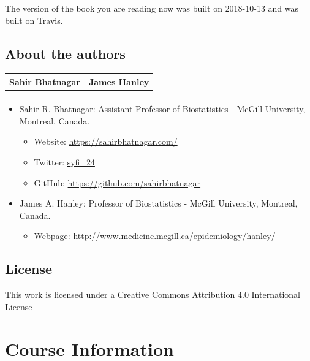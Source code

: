 \documentclass[]{book}
\providecommand{\tightlist}{%
  \setlength{\itemsep}{0pt}\setlength{\parskip}{0pt}}
\providecommand{\tightlist}{%
  \setlength{\itemsep}{0pt}\setlength{\parskip}{0pt}}
\theoremstyle{definition}
\theoremstyle{definition}
\theoremstyle{definition}
\theoremstyle{remark}
\begin{document}
The version of the book you are reading now was built on 2018-10-13 and
was built on
\href{https://travis-ci.org/sahirbhatnagar/MATH697}{Travis}.

\section{About the authors}\label{about-the-authors}

\begin{longtable}[]{@{}cc@{}}
\toprule
Sahir Bhatnagar & James Hanley\tabularnewline
\midrule
\endhead
&\tabularnewline
\bottomrule
\end{longtable}

\begin{itemize}
\tightlist
\item
  Sahir R. Bhatnagar: Assistant Professor of Biostatistics - McGill
  University, Montreal, Canada.

  \begin{itemize}
  \tightlist
  \item
    Website: \url{https://sahirbhatnagar.com/}\\
  \item
    Twitter: \href{https://twitter.com/syfi_24}{syfi\_24}\\
  \item
    GitHub: \url{https://github.com/sahirbhatnagar}\\
  \end{itemize}
\item
  James A. Hanley: Professor of Biostatistics - McGill University,
  Montreal, Canada.

  \begin{itemize}
  \tightlist
  \item
    Webpage: \url{http://www.medicine.mcgill.ca/epidemiology/hanley/}
  \end{itemize}
\end{itemize}

\section{License}\label{license}

This work is licensed under a Creative Commons Attribution 4.0
International License

\chapter{Course Information}\label{course-information}
\end{document}
